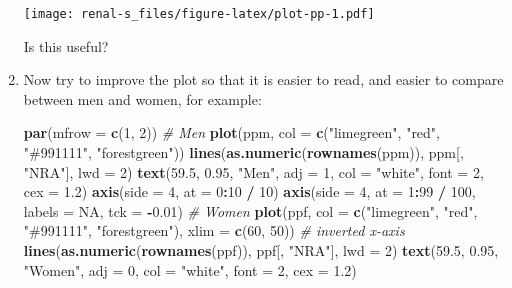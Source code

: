 \documentclass[
]{book}
\newenvironment{Shaded}{\begin{snugshade}}{\end{snugshade}}
\newcommand{\AttributeTok}[1]{\textcolor[rgb]{0.13,0.29,0.53}{#1}}
\newcommand{\CommentTok}[1]{\textcolor[rgb]{0.56,0.35,0.01}{\textit{#1}}}
\newcommand{\ConstantTok}[1]{\textcolor[rgb]{0.56,0.35,0.01}{#1}}
\newcommand{\DecValTok}[1]{\textcolor[rgb]{0.00,0.00,0.81}{#1}}
\newcommand{\FloatTok}[1]{\textcolor[rgb]{0.00,0.00,0.81}{#1}}
\newcommand{\FunctionTok}[1]{\textcolor[rgb]{0.13,0.29,0.53}{\textbf{#1}}}
\newcommand{\NormalTok}[1]{#1}
\newcommand{\SpecialCharTok}[1]{\textcolor[rgb]{0.81,0.36,0.00}{\textbf{#1}}}
\newcommand{\StringTok}[1]{\textcolor[rgb]{0.31,0.60,0.02}{#1}}
\begin{document}
\begin{enumerate}
  \texttt{[image: renal-s\_files/figure-latex/plot-pp-1.pdf]}

  Is this useful?
\item
  Now try to improve the plot so that it is easier to read, and
  easier to compare between men and women, for example:

\begin{Shaded}
\begin{Highlighting}[]
\FunctionTok{par}\NormalTok{(}\AttributeTok{mfrow =} \FunctionTok{c}\NormalTok{(}\DecValTok{1}\NormalTok{, }\DecValTok{2}\NormalTok{))}
\CommentTok{\# Men}
\FunctionTok{plot}\NormalTok{(ppm, }\AttributeTok{col =} \FunctionTok{c}\NormalTok{(}\StringTok{"limegreen"}\NormalTok{, }\StringTok{"red"}\NormalTok{, }\StringTok{"\#991111"}\NormalTok{, }\StringTok{"forestgreen"}\NormalTok{))}
\FunctionTok{lines}\NormalTok{(}\FunctionTok{as.numeric}\NormalTok{(}\FunctionTok{rownames}\NormalTok{(ppm)), ppm[, }\StringTok{"NRA"}\NormalTok{], }\AttributeTok{lwd =} \DecValTok{2}\NormalTok{)}
\FunctionTok{text}\NormalTok{(}\FloatTok{59.5}\NormalTok{, }\FloatTok{0.95}\NormalTok{, }\StringTok{"Men"}\NormalTok{, }\AttributeTok{adj =} \DecValTok{1}\NormalTok{, }\AttributeTok{col =} \StringTok{"white"}\NormalTok{, }\AttributeTok{font =} \DecValTok{2}\NormalTok{, }\AttributeTok{cex =} \FloatTok{1.2}\NormalTok{)}
\FunctionTok{axis}\NormalTok{(}\AttributeTok{side =} \DecValTok{4}\NormalTok{, }\AttributeTok{at =} \DecValTok{0}\SpecialCharTok{:}\DecValTok{10} \SpecialCharTok{/} \DecValTok{10}\NormalTok{)}
\FunctionTok{axis}\NormalTok{(}\AttributeTok{side =} \DecValTok{4}\NormalTok{, }\AttributeTok{at =} \DecValTok{1}\SpecialCharTok{:}\DecValTok{99} \SpecialCharTok{/} \DecValTok{100}\NormalTok{, }\AttributeTok{labels =} \ConstantTok{NA}\NormalTok{, }\AttributeTok{tck =} \SpecialCharTok{{-}}\FloatTok{0.01}\NormalTok{)}
\CommentTok{\# Women }
\FunctionTok{plot}\NormalTok{(ppf, }\AttributeTok{col =} \FunctionTok{c}\NormalTok{(}\StringTok{"limegreen"}\NormalTok{, }\StringTok{"red"}\NormalTok{, }\StringTok{"\#991111"}\NormalTok{, }\StringTok{"forestgreen"}\NormalTok{),}
          \AttributeTok{xlim =} \FunctionTok{c}\NormalTok{(}\DecValTok{60}\NormalTok{, }\DecValTok{50}\NormalTok{)) }\CommentTok{\# inverted x{-}axis}
\FunctionTok{lines}\NormalTok{(}\FunctionTok{as.numeric}\NormalTok{(}\FunctionTok{rownames}\NormalTok{(ppf)), ppf[, }\StringTok{"NRA"}\NormalTok{], }\AttributeTok{lwd =} \DecValTok{2}\NormalTok{)}
\FunctionTok{text}\NormalTok{(}\FloatTok{59.5}\NormalTok{, }\FloatTok{0.95}\NormalTok{, }\StringTok{"Women"}\NormalTok{, }\AttributeTok{adj =} \DecValTok{0}\NormalTok{, }\AttributeTok{col =} \StringTok{"white"}\NormalTok{, }\AttributeTok{font =} \DecValTok{2}\NormalTok{, }\AttributeTok{cex =} \FloatTok{1.2}\NormalTok{)}

\end{Highlighting}
\end{Shaded}
\end{enumerate}
\end{document}
